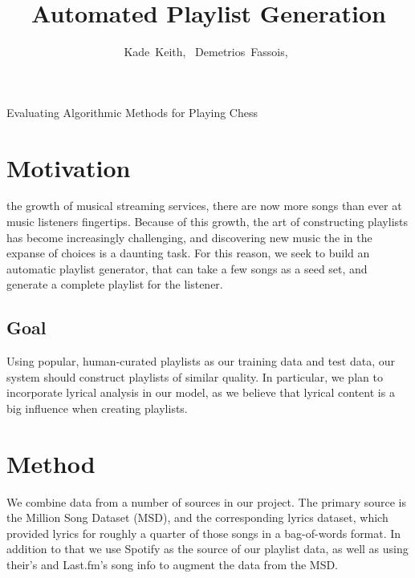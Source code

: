 \documentclass[10pt,journal,compsoc]{IEEEtran}
\begin{document}
\title{Automated Playlist Generation\\}

\author{
  Kade~Keith,~
  Demetrios~Fassois,~
}

%
{Evaluating Algorithmic Methods for Playing Chess}


\maketitle

\section{Motivation}

 the growth of musical streaming services, there are now more songs than ever at music listeners fingertips. Because of this growth, the art of constructing playlists has become increasingly challenging, and discovering new music the in the expanse of choices is a daunting task. For this reason, we seek to build an automatic playlist generator, that can take a few songs as a seed set, and generate a complete playlist for the listener.

\subsection{Goal}
Using popular, human-curated playlists as our training data and test data, our system should construct playlists of similar quality. In particular, we plan to incorporate lyrical analysis in our model, as we believe that lyrical content is a big influence when creating playlists.

\section{Method}
We combine data from a number of sources in our project. The primary source is the Million Song Dataset \cite{msd} (MSD), and the corresponding lyrics dataset, which provided lyrics for roughly a quarter of those songs in a bag-of-words format. In addition to that we use Spotify \cite{spotify} as the source of our playlist data, as well as using their's and Last.fm's \cite{lastfm} song info to augment the data from the MSD.
\end{document}
